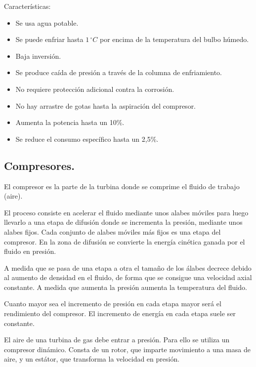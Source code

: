 			\vspace{0.5cm}
			Características:
			\begin{itemize}
				\item Se usa agua potable.
				\item Se puede enfriar hasta $1\,^\circ C$ por encima de la temperatura del bulbo húmedo.
				\item Baja inversión.
				\item Se produce caída de presión a través de la columna de enfriamiento.
				\item No requiere protección adicional contra la corrosión.
				\item No hay arrastre de gotas hasta la aspiración del compresor.
				\item Aumenta la potencia hasta un 10\%.
				\item Se reduce el consumo específico hasta un 2,5\%.
			\end{itemize}

		\subsection{Compresores.}
			El compresor es la parte de la turbina donde se comprime el fluido de trabajo (aire).
			
			
			El proceso consiste en acelerar el fluido mediante unos alabes móviles para luego llevarlo a una etapa de difusión donde se incrementa la presión, mediante unos alabes fijos. Cada conjunto de alabes móviles más fijos es una etapa del compresor. En la zona de difusión se convierte la energía cinética ganada por el fluido en presión.
			
			
			A medida que se pasa de una etapa a otra el tamaño de los álabes decrece debido al aumento de densidad en el fluido, de forma que se consigue una velocidad axial constante. A medida que aumenta la presión aumenta la temperatura del fluido. 
			
			
			Cuanto mayor sea el incremento de presión en cada etapa mayor será el rendimiento del compresor. El incremento de energía en cada etapa suele ser constante.
		
		
			El aire de una turbina de gas debe entrar a presión. Para ello se utiliza un compresor dinámico. Consta de un rotor, que imparte movimiento a una masa de aire, y un estátor, que transforma la velocidad en presión.
			
